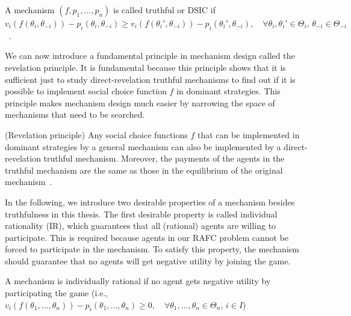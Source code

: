 \documentclass[11pt]{phdthesis}
\begin{document}
\begin{definition}[truthfulness]
    A mechanism $(f,p_1,...,p_n)$ is called truthful or DSIC  if $v_i(f(\theta_i, \theta_{-i})) - p_i(\theta_i, \theta_{-i}) \geq v_i(f(\theta_i', \theta_{-i})) - p_i(\theta_i',  \theta_{-i}), \quad \forall \theta_i , \theta_i' \in \Theta_i ,\, \theta_{-i} \in \Theta_{-i} $~\citep[Definition 9.15]{nisan2007algorithmic}.
\end{definition}


%
We can now introduce a fundamental principle in mechanism design called the revelation principle. It is fundamental because this principle shows that it is sufficient just to study direct-revelation truthful mechanisms to find out if it is possible to implement social choice function $f$ in dominant strategies. This principle makes mechanism design much easier by narrowing the space of mechanisms that need to be searched. 

\begin{proposition}(Revelation principle) \label{revelation principle}
    Any social choice functions $f$ that can be implemented in dominant strategies by a general mechanism can also be implemented by a direct-revelation truthful mechanism. Moreover, the payments of the agents in the truthful mechanism are the same as those in the equilibrium of the original mechanism~\citep[Proposition 9.25]{nisan2007algorithmic}.
\end{proposition}



In the following, we introduce two desirable properties of a mechanism besides truthfulness in this thesis. The first desirable property is called individual rationality (IR), which guarantees that all (rational) agents are willing to participate. This is required because agents in our RAFC problem cannot be forced to participate in the mechanism. To satisfy this property, the mechanism should guarantee that no agents will get negative utility by joining the game. 
\begin{definition} [IR]
    A mechanism is individually rational if no agent gets negative utility by participating the game (i.e., $v_i(f(\theta_1,...,\theta_n)) - p_i(\theta_1,...,\theta_n) \geq 0, \quad \forall \theta_1 ,\ldots,\theta_n \in \Theta_n, \, i \in I$)~\citep[Definition 9.18]{nisan2007algorithmic}
\end{definition}
\end{document}
